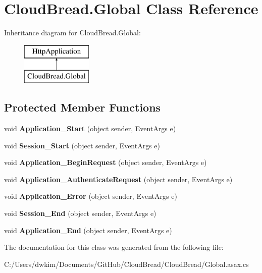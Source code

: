 \hypertarget{a00088}{}\section{Cloud\+Bread.\+Global Class Reference}
\label{a00088}
Inheritance diagram for Cloud\+Bread.\+Global\+:\begin{figure}[H]
\begin{center}
\leavevmode
\includegraphics[height=2.000000cm]{a00088}
\end{center}
\end{figure}
\subsection*{Protected Member Functions}
\begin{DoxyCompactItemize}
\item 
void {\bfseries Application\+\_\+\+Start} (object sender, Event\+Args e)\hypertarget{a00088_a396d25a39052b762fa2213e392ddc797}{}\label{a00088_a396d25a39052b762fa2213e392ddc797}

\item 
void {\bfseries Session\+\_\+\+Start} (object sender, Event\+Args e)\hypertarget{a00088_a8708272a1a0e193b8d608c204b915e40}{}\label{a00088_a8708272a1a0e193b8d608c204b915e40}

\item 
void {\bfseries Application\+\_\+\+Begin\+Request} (object sender, Event\+Args e)\hypertarget{a00088_a1876449576a2bb502623da2c132321d8}{}\label{a00088_a1876449576a2bb502623da2c132321d8}

\item 
void {\bfseries Application\+\_\+\+Authenticate\+Request} (object sender, Event\+Args e)\hypertarget{a00088_a4e8a04fe20ec51fa332bc9de44c169b6}{}\label{a00088_a4e8a04fe20ec51fa332bc9de44c169b6}

\item 
void {\bfseries Application\+\_\+\+Error} (object sender, Event\+Args e)\hypertarget{a00088_a28279fb2abc32e11a0bb8426883c218f}{}\label{a00088_a28279fb2abc32e11a0bb8426883c218f}

\item 
void {\bfseries Session\+\_\+\+End} (object sender, Event\+Args e)\hypertarget{a00088_a2837df16b0eae9e085156b8e064c4f14}{}\label{a00088_a2837df16b0eae9e085156b8e064c4f14}

\item 
void {\bfseries Application\+\_\+\+End} (object sender, Event\+Args e)\hypertarget{a00088_abbeb7280f6d00e11731d635e24aae8f3}{}\label{a00088_abbeb7280f6d00e11731d635e24aae8f3}

\end{DoxyCompactItemize}


The documentation for this class was generated from the following file\+:\begin{DoxyCompactItemize}
\item 
C\+:/\+Users/dwkim/\+Documents/\+Git\+Hub/\+Cloud\+Bread/\+Cloud\+Bread/Global.\+asax.\+cs\end{DoxyCompactItemize}
